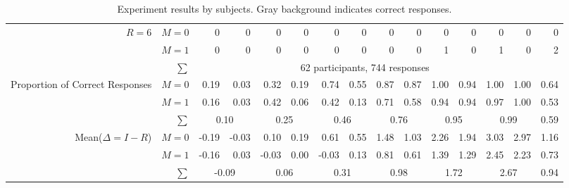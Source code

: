 \begin{table}
\begin{center}
\begin{tabular}{rrrrrrrrrrrrrrr}
\midrule
\multirow{2}{*}{$R=6$} & $M=0$ & 0 & 0 & 0 & 0 & 0 & 0 & 0 & 0 & 0 & 0 & \cellcolor[gray]{0.9} 0 & \cellcolor[gray]{0.9} 0 & 0 \\
 & $M=1$ & 0 & 0 & 0 & 0 & 0 & 0 & 0 & 0 & 1 & 0 & \cellcolor[gray]{0.9} 1 & \cellcolor[gray]{0.9} 0 & 2 \\ 
\midrule 
 &  $\sum$& \multicolumn{12}{c}{62 participants, 744 responses} & \\    
\midrule[1pt]
\multirow{3}{*}{Proportion of Correct Responses} & $M=0$ & 0.19 & 0.03 & 0.32 & 0.19 & 0.74 & 0.55 & 0.87 & 0.87 & 1.00 & 0.94 & 1.00 & 1.00 & 0.64 \\ 
 & $M=1$ & 0.16 & 0.03 & 0.42 & 0.06 & 0.42 & 0.13 & 0.71 & 0.58 & 0.94 & 0.94 & 0.97 & 1.00 & 0.53 \\ \cmidrule(r){3-4} \cmidrule(lr){5-6} \cmidrule(lr){7-8} \cmidrule(lr){9-10} \cmidrule(lr){11-12} \cmidrule(lr){13-14} \cmidrule(l){15-15}
 & $\sum$ & \multicolumn{2}{c}{0.10} & \multicolumn{ 2}{c}{0.25} & \multicolumn{2}{c}{0.46} & \multicolumn{2}{c}{0.76} & \multicolumn{ 2}{c}{0.95} & \multicolumn{2}{c}{0.99} & 0.59 \\  
\midrule
\multirow{3}{*}{Mean($\Delta = I-R$)} & $M=0$ & -0.19 & -0.03 & 0.10 & 0.19 & 0.61 & 0.55 & 1.48 & 1.03 & 2.26 & 1.94 & 3.03 & 2.97 & 1.16 \\ 
 & $M=1$ & -0.16 & 0.03 & -0.03 & 0.00 & -0.03 & 0.13 & 0.81 & 0.61 & 1.39 & 1.29 & 2.45 & 2.23 & 0.73 \\ \cmidrule(r){3-4} \cmidrule(lr){5-6} \cmidrule(lr){7-8} \cmidrule(lr){9-10} \cmidrule(lr){11-12} \cmidrule(lr){13-14} \cmidrule(l){15-15}
 & $\sum$ & \multicolumn{2}{c}{-0.09} & \multicolumn{2}{c}{0.06} & \multicolumn{2}{c}{0.31} & \multicolumn{2}{c}{0.98} & \multicolumn{ 2}{c}{1.72} & \multicolumn{2}{c}{2.67} & 0.94 \\ 
\bottomrule[1.5pt]
\end{tabular}
\end{center}
\caption{Experiment results by subjects. Gray background indicates correct responses.}
\label{tab:resultsoverall}
\end{table}
